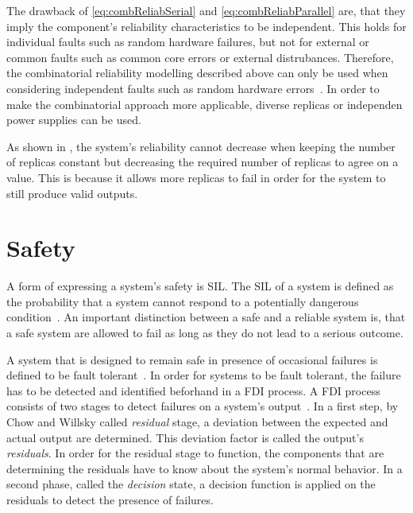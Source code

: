 The drawback of \autoref{eq:combReliabSerial} and \autoref{eq:combReliabParallel} are, that they imply the component's reliability characteristics to be independent.
This holds for individual faults such as random hardware failures, but not for external or common faults such as common core errors or external distrubances.
Therefore, the combinatorial reliability modelling described above can only be used when considering independent faults such as random hardware errors~\cite{BarryFaultToleranceAnalysis}.
In order to make the combinatorial approach more applicable, diverse replicas or independen power supplies can be used.



As shown in , the system's reliability cannot decrease when keeping the number of replicas constant but decreasing the required number of replicas to agree on a value.
This is because it allows more replicas to fail in order for the system to still produce valid outputs.

\section{Safety}
A form of expressing a system's safety is \gls*{SIL}.
The \gls*{SIL} of a system is defined as the probability that a system cannot respond to a potentially dangerous condition~\cite{SallekSIL}.
An important distinction between a safe and a reliable system is, that a safe system are allowed to fail as long as they do not lead to a serious outcome.

A system that is designed to remain safe in presence of occasional failures is defined to be fault tolerant~\cite{RandellFaultTolerance}.
In order for systems to be fault tolerant, the failure has to be detected and identified beforhand in a \gls*{FDI} process.
A \gls*{FDI} process consists of two stages to detect failures on a system's output~\cite{ChowFailureDetectionSystems}.
In a first step, by Chow and Willsky called \textit{residual} stage, a deviation between the expected and actual output are determined.
This deviation factor is called the output's \textit{residuals}.
In order for the residual stage to function, the components that are determining the residuals have to know about the system's normal behavior.
In a second phase, called the \textit{decision} state, a decision function is applied on the residuals to detect the presence of failures.


